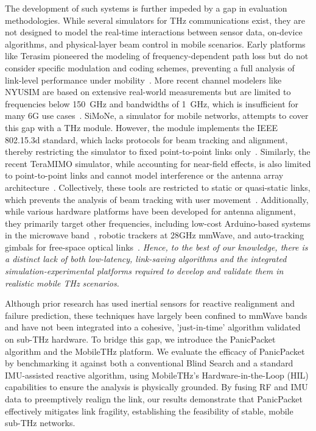 \documentclass[fleqn,10pt]{wlscirep}
\begin{document}
The development of such systems is further impeded by a gap in evaluation methodologies. While several simulators for THz communications exist, they are not designed to model the real-time interactions between sensor data, on-device algorithms, and physical-layer beam control in mobile scenarios. Early platforms like Terasim pioneered the modeling of frequency-dependent path loss but do not consider specific modulation and coding schemes, preventing a full analysis of link-level performance under mobility~\cite{HOSSAIN2019100004, eckhardt2022modular}. More recent channel modelers like NYUSIM are based on extensive real-world measurements but are limited to frequencies below 150~GHz and bandwidths of 1~GHz, which is insufficient for many 6G use cases~\cite{10367974}. SiMoNe, a simulator for mobile networks, attempts to cover this gap with a THz module. However, the module implements the IEEE 802.15.3d standard, which lacks protocols for beam tracking and alignment, thereby restricting the simulator to fixed point-to-point links only~\cite{rose2015simone, eckhardt2022modular}. Similarly, the recent TeraMIMO simulator, while accounting for near-field effects, is also limited to point-to-point links and cannot model interference or the antenna array architecture~\cite{tarboush2021teramimo, bodet2023directional}. Collectively, these tools are restricted to static or quasi-static links, which prevents the analysis of beam tracking with user movement~\cite{Petrov2023Mobile}. Additionally, while various hardware platforms have been developed for antenna alignment, they primarily target other frequencies, including low-cost Arduino-based systems in the microwave band~\cite{Abdulwahab2020}, robotic trackers at 28GHz mmWave\cite{Keshavamurthy2022}, and auto-tracking gimbals for free-space optical links~\cite{AlAkkoumi2008}. \emph{Hence, to the best of our knowledge, there is a distinct lack of both low-latency, link-saving algorithms and the integrated simulation-experimental platforms required to develop and validate them in realistic mobile THz scenarios.}

Although prior research has used inertial sensors for reactive realignment\cite{9391649, electronics8020142} and failure prediction\cite{9838772, 9814507}, these techniques have largely been confined to mmWave bands and have not been integrated into a cohesive, 'just-in-time' algorithm validated on sub-THz hardware. To bridge this gap, we introduce the PanicPacket algorithm and the MobileTHz platform. We evaluate the efficacy of PanicPacket by benchmarking it against both a conventional Blind Search and a standard IMU-assisted reactive algorithm, using MobileTHz’s Hardware-in-the-Loop (HIL) capabilities to ensure the analysis is physically grounded. By fusing RF and IMU data to preemptively realign the link, our results demonstrate that PanicPacket effectively mitigates link fragility, establishing the feasibility of stable, mobile sub-THz networks.
\end{document}
